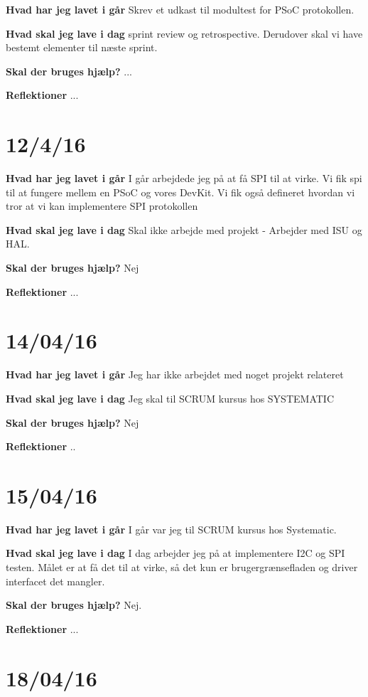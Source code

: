 \documentclass{article}
\begin{document}
	\textbf{Hvad har jeg lavet i går}
	Skrev et udkast til modultest for PSoC protokollen.
	
	\textbf{Hvad skal jeg lave i dag}
	sprint review og retrospective. Derudover skal vi have bestemt elementer til næste sprint.
	
	\textbf{Skal der bruges hjælp?}
	...
	
	\textbf{Reflektioner}
	...
	
	
	\section{12/4/16}
	
	\textbf{Hvad har jeg lavet i går}
	I går arbejdede jeg på at få SPI til at virke. Vi fik spi til at fungere mellem en PSoC og vores DevKit. Vi fik også defineret hvordan vi tror at vi kan implementere SPI protokollen
	
	\textbf{Hvad skal jeg lave i dag}
	Skal ikke arbejde med projekt - Arbejder med ISU og HAL.
	
	\textbf{Skal der bruges hjælp?}
	Nej
	
	\textbf{Reflektioner}
	...
	
	
	\section{14/04/16}
	
	\textbf{Hvad har jeg lavet i går}
	Jeg har ikke arbejdet med noget projekt relateret
	
	\textbf{Hvad skal jeg lave i dag}
	Jeg skal til SCRUM kursus hos SYSTEMATIC
	
	\textbf{Skal der bruges hjælp?}
	Nej
	
	\textbf{Reflektioner}
	..
	
	\section{15/04/16}
	
	\textbf{Hvad har jeg lavet i går}
	I går var jeg til SCRUM kursus hos Systematic.
	
	\textbf{Hvad skal jeg lave i dag}
	I dag arbejder jeg på at implementere I2C og SPI testen. Målet er at få det til at virke, så det kun er brugergrænsefladen og driver interfacet det mangler.
	
	\textbf{Skal der bruges hjælp?}
	Nej.
	
	\textbf{Reflektioner}
	...
	
	\section{18/04/16}
	
\end{document}
